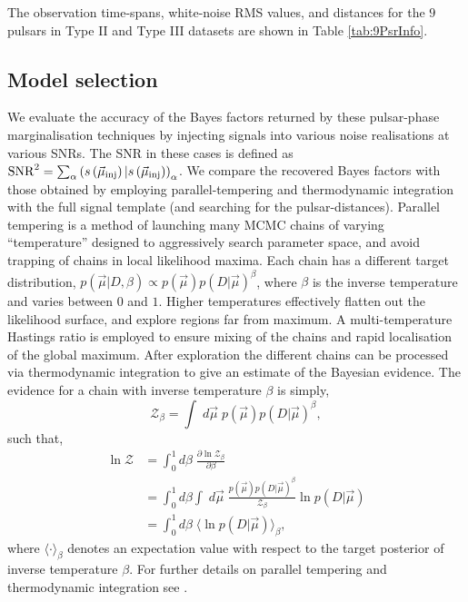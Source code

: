 \documentclass[twocolappendix,tighten]{emulateapj}
\begin{document}
The observation time-spans, white-noise RMS values, and distances for the $9$ pulsars in Type II and Type III datasets are shown in Table \ref{tab:9PsrInfo}.

\subsection{Model selection}

We evaluate the accuracy of the Bayes factors returned by these pulsar-phase marginalisation techniques by injecting signals into various noise realisations at various SNRs. The SNR in these cases is defined as ${\rm SNR}^2 = \sum_{\alpha}\left(s\left(\vec{\mu}_{\rm inj}\right)|s\left(\vec{\mu}_{\rm inj}\right)\right)_{\alpha}$. We compare the recovered Bayes factors with those obtained by employing parallel-tempering and thermodynamic integration with the full signal template (and searching for the pulsar-distances). Parallel tempering is a method of launching many MCMC chains of varying ``temperature'' designed to aggressively search parameter space, and avoid trapping of chains in local likelihood maxima. Each chain has a different target distribution, $p(\vec\mu|D,\beta)\propto p(\vec\mu)p(D|\vec\mu)^{\beta}$, where $\beta$ is the inverse temperature and varies between $0$ and $1$. Higher temperatures effectively flatten out the likelihood surface, and explore regions far from maximum. A multi-temperature Hastings ratio is employed to ensure mixing of the chains and rapid localisation of the global maximum. After exploration the different chains can be processed via thermodynamic integration to give an estimate of the Bayesian evidence. The evidence for a chain with inverse temperature $\beta$ is simply,
\begin{equation}
\mathcal{Z}_{\beta} = \int\;d\vec\mu\; p(\vec\mu)p(D|\vec\mu)^{\beta},
\end{equation}
such that,
\begin{align}
\ln\mathcal{Z} &= \int_0^1d\beta\;\frac{\partial\ln\mathcal{Z}_{\beta}}{\partial\beta} \nonumber\\
&= \int_0^1d\beta\int\;d\vec\mu\; \frac{p(\vec\mu)p(D|\vec\mu)^{\beta}}{\mathcal{Z}_{\beta}}\ln p(D|\vec\mu)\nonumber\\
&= \int_0^1d\beta\;\langle\ln p(D|\vec\mu)\rangle_{\beta},
\end{align}
where $\langle\cdot\rangle_{\beta}$ denotes an expectation value with respect to the target posterior of inverse temperature $\beta$. For further details on parallel tempering and thermodynamic integration see \citet[][and references therein]{ellisbayesian2013}.
\end{document}
